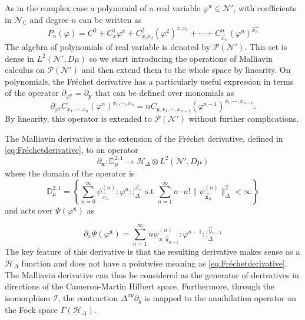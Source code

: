 \documentclass[12pt]{article}%
\newcommand{\mb}[1]{{\mathbf{#1}}}
\begin{document}
As in the complex case a polynomial of  a real variable $\varphi^{\mb{x}}\in \mathcal{N}'$,  with coefficients in $\mathcal{N}_{\mathbb{C}}$ and degree $n$  can be written as
\begin{equation}
\label{eq:realpolynomials} 
P_n(\varphi)= C^0+C^1_x\varphi^x+C^{2}_{x_1x_2}(\varphi^2)^{x_1x_2}+\cdots+C^n_{\vec{x}_n}(\varphi^n)^{\vec{x_n}}
\end{equation}    
 The algebra of polynomials of real variable is denoted by $\mathcal{P}(\mathcal{N}')$. This set is dense in $L^2(\mathcal{N}',D\mu)$ so we start introducing the operations of Malliavin calculus on $\mathcal{P}(\mathcal{N}')$ and then extend them to the whole space by linearity. On polynomials, the Fréchet derivative has a particularly useful expression in terms of the operator $\partial_{\varphi^\mathbf{y}}=\partial_{\mathbf{y}}$ that can be defined over monomials as 
\begin{equation}
\label{eq:Fréchetderivative}
\partial_{\varphi^y} C_{x_1,\cdots,x_n}(\varphi^n)^{x_1,\cdots,x_n}=nC_{y,x_1,\cdots,x_{n-1}}(\varphi^{n-1})^{x_1,\cdots,x_{n-1}} .
\end{equation}
By linearity, this operator is extended  to $\mathcal{P}(\mathcal{N}')$ without further complications.

The Malliavin derivative is the extension of the Fréchet derivative, defined in \eqref{eq:Fréchetderivative}, to an operator 
\begin{equation}
\label{eq:malliavinDerivative}
\partial_\mathbf{x}: \mathbb{D}_\mu^{2,1}\longrightarrow \mathcal{H}_\Delta\otimes L^2(\mathcal{N}',D\mu)
\end{equation}
where the domain of the operator is
\begin{equation}
    \label{eq:MalliavinSovoleb}
    \mathbb{D}_\mu^{2,1}=\left\{\sum_{n=0}^\infty\psi^{(n)}_{\vec{x}_n}:\varphi^n:\lvert_\Delta^{\vec{x}_n}\textrm{ s.t } \sum_{n=1}^\infty n\cdot n!\lVert\psi^{(n)}_{\vec{\mathbf{x}}_n}\rVert_{\Delta}^2< \infty \right\}
\end{equation}
and acts over $\Psi(\varphi^\mathbf{x})$ as

\begin{equation}
\label{eq:actionMalliavin}
\partial_x\Psi(\varphi^\mathbf{x})=\sum_{n=1}^\infty n\psi^{(n)}_{x,\vec{y}_{n-1}}:\varphi^{n-1}:\lvert_\Delta^{\vec{y}_{n-1}}
\end{equation}
The key feature of this derivative is that the resulting derivative makes sense as a $\mathcal{H}_\Delta$ function and does not have a pointwise meaning as  \eqref{eq:Fréchetderivative}. The Malliavin derivative can thus be considered as the generator of derivatives in directions of the Cameron-Martin Hilbert space. Furthermore, through the isomorphism $\mathcal{I}$, the contraction $\Delta^{xy}\partial_y$ is mapped to the annihilation operator on the Fock space $\Gamma(\mathcal{H}_\Delta)$.
\end{document}
